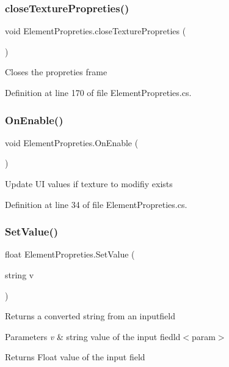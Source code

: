 \subsubsection{close\+Texture\+Propreties()}
{\footnotesize\ttfamily void Element\+Propreties.\+close\+Texture\+Propreties (\begin{DoxyParamCaption}{ }\end{DoxyParamCaption})}



Closes the propreties frame 



Definition at line 170 of file Element\+Propreties.\+cs.

\mbox{\label{class_element_propreties_a1cea602e8d38db305bd4a30b7cea1305}} 
\subsubsection{On\+Enable()}
{\footnotesize\ttfamily void Element\+Propreties.\+On\+Enable (\begin{DoxyParamCaption}{ }\end{DoxyParamCaption})}

Update UI values if texture to modifiy exists 

Definition at line 34 of file Element\+Propreties.\+cs.

\mbox{\label{class_element_propreties_aa983d852877fbf6fd755555db30be93c}} 
\subsubsection{Set\+Value()}
{\footnotesize\ttfamily float Element\+Propreties.\+Set\+Value (\begin{DoxyParamCaption}\item[{string}]{v }\end{DoxyParamCaption})}



Returns a converted string from an inputfield 


\begin{DoxyParams}{Parameters}
{\em v} & string value of the input fiedld$<$param$>$ \begin{DoxyReturn}{Returns}
Float value of the input field
\end{DoxyReturn}
\\
\hline
\end{DoxyParams}


